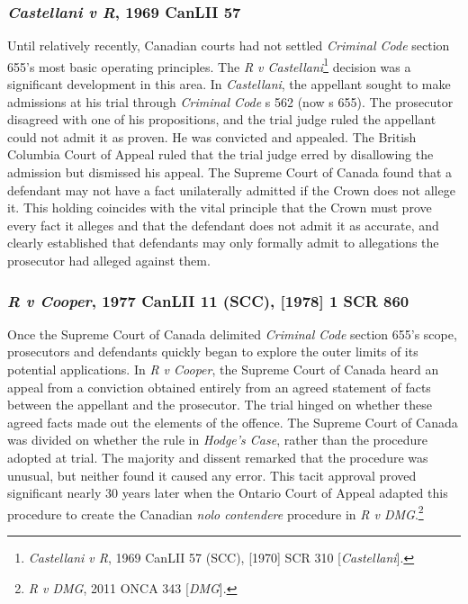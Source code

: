 \subsubsection{\textit{Castellani v R}, 1969 CanLII 57}

Until relatively recently, Canadian courts had not settled \textit{Criminal Code} section 655's most basic operating principles. The \textit{R v Castellani}\footnote{\textit{Castellani v R}, 1969 CanLII 57 (SCC), [1970] SCR 310 [\textit{Castellani}].} decision was a significant development in this area. In \textit{Castellani}, the appellant sought to make admissions at his trial through \textit{Criminal Code} s 562 (now s 655). The prosecutor disagreed with one of his propositions, and the trial judge ruled the appellant could not admit it as proven. He was convicted and appealed. The British Columbia Court of Appeal ruled that the trial judge erred by disallowing the admission but dismissed his appeal. The Supreme Court of Canada found that a defendant may not have a fact unilaterally admitted if the Crown does not allege it. This holding coincides with the vital principle that the Crown must prove every fact it alleges and that the defendant does not admit it as accurate, and clearly established that defendants may only formally admit to allegations the prosecutor had alleged against them. 

\subsubsection{\textit{R v Cooper}, 1977 CanLII 11 (SCC), [1978] 1 SCR 860}

Once the Supreme Court of Canada delimited \textit{Criminal Code} section 655's scope, prosecutors and defendants quickly began to explore the outer limits of its potential applications. In \textit{R v Cooper}, the Supreme Court of Canada heard an appeal from a conviction obtained entirely from an agreed statement of facts between the appellant and the prosecutor. The trial hinged on whether these agreed facts made out the elements of the offence. The Supreme Court of Canada was divided on whether the rule in \textit{Hodge's Case}, rather than the procedure adopted at trial. The majority and dissent remarked that the procedure was unusual, but neither found it caused any error. This tacit approval proved significant nearly 30 years later when the Ontario Court of Appeal adapted this procedure to create the Canadian \textit{nolo contendere} procedure in \textit{R v DMG}.\footnote{\textit{R v DMG}, 2011 ONCA 343 [\textit{DMG}].}

